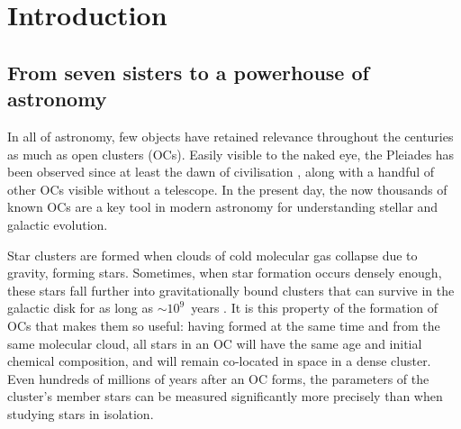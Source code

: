 %
\chapter{Introduction}
\label{sec:intro}


\section{From seven sisters to a powerhouse of astronomy}
\label{sec:intro:intro}

In all of astronomy, few objects have retained relevance throughout the centuries as much as open clusters (OCs). Easily visible to the naked eye, the Pleiades has been observed since at least the dawn of civilisation \citep{rappengluck_palaeolithic_timekeepers_2001,mozel_sky_disk_2003}, along with a handful of other OCs visible without a telescope. In the present day, the now thousands of known OCs are a key tool in modern astronomy for understanding stellar and galactic evolution.

Star clusters are formed when clouds of cold molecular gas collapse due to gravity, forming stars. Sometimes, when star formation occurs densely enough, these stars fall further into gravitationally bound clusters that can survive in the galactic disk for as long as $\sim 10^9$~years \citep{lada_embedded_2003,portegies_zwart_young_2010}. It is this property of the formation of OCs that makes them so useful: having formed at the same time and from the same molecular cloud, all stars in an OC will have the same age and initial chemical composition, and will remain co-located in space in a dense cluster. Even hundreds of millions of years after an OC forms, the parameters of the cluster's member stars can be measured significantly more precisely than when studying stars in isolation. 

